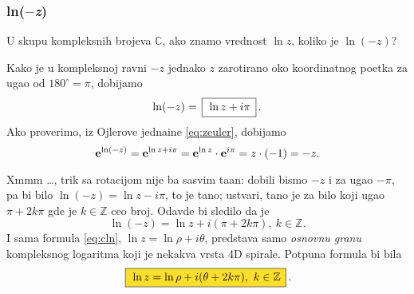 \subsubsection{ln($-$\textit{z})}

\zadatak U skupu kompleksnih brojeva $\mathbb C$, ako znamo vrednost $\ln z$,
koliko je $\ln(-z)$?

\resenje Kako je u kompleksnoj ravni $-z$ jednako $z$ zarotirano 
oko koordi\-natnog po{\cv}etka
za ugao od $180^\circ=\pi$, dobijamo
$$
\ln (-z) = \ram{\ln z +i\pi}.
$$ 
Ako proverimo, iz Ojlerove jedna{\cv}ine \eqref{eq:zeuler}, dobijamo
$$
{\bf e}^{\ln(-z)} = {\bf e}^{\ln z+i\pi} = {\bf e}^{\ln z}\cdot {\bf e}^{i\pi}=z \cdot (-1)=-z.
$$

\dodatak Xmmm \dots, trik sa rotacijom nije ba{\sv} sasvim ta{\cv}an: dobili bismo $-z$ i za ugao $-\pi$,
pa bi bilo $\ln(-z)=\ln z-i\pi$, {\sv}to je ta{\cv}no;
ustvari, ta{\cv}no je za bilo koji ugao $\pi+2k\pi$ gde je $k\in{\mathbb Z}$ ceo broj. Odavde bi sledilo da je
$$
\ln(-z) = \ln z + i(\pi+2k\pi),\ k\in{\mathbb Z}.
$$
I sama formula \eqref{eq:cln}, $\ln z=\ln\rho + i\theta$, predstav{\lj}a samo {\sl osnovnu granu\/}
kompleksnog logaritma koji je nekakva vrsta 4D spirale. Potpuna formula bi bila
\begin{equation}
    \okvir{\ln z=\ln\rho + i(\theta + 2k\pi),\ k\in{\mathbb Z}} .
\end{equation}